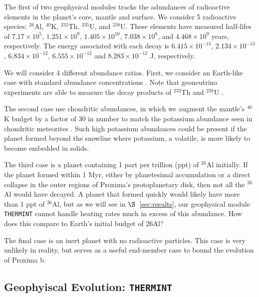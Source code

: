 \documentclass[preprint,12pt]{aastex}
\newcommand{\xxx}[1]{{\color{red} #1}} %
\def\eg{{\it e.g.\ }}
\def\thermint{\texttt{\footnotesize{THERMINT}}\xspace}
\begin{document}
The first of two geophysical modules tracks the adundances of
radioactive elements in the planet's core, mantle and surface. We
consider 5 radioactive species: $^{26}$Al, $^{40}$K, $^{232}$Th,
$^{235}$U, and $^{238}$U. These elements have measured half-lifes of
$7.17 \times 10^5$, $1.251 \times 10^9$, $1.405 \times 10^{10}$,
$7.038 \times 10^8$, and $4.468 \times 10^9$ years, respectively. The
energy associated with each decay is $6.415 \times 10^{-13}$,
$2.134 \times 10^{-13}$, $6.834 \times 10^{-12}$,
$6.555 \times 10^{-12}$ and $8.283 \times 10^{-12}$ J, respectively.

We will consider 4 different abundance ratios. First, we consider an
Earth-like case with standard abundance concentrations
\citep[\eg][]{Korenaga03,Arevalo09,Huang13}. Note that geoneutrino
experiments are able to measure the decay products of $^{232}$Th and
$^{238}$U \citep{Raghavan98,Araki05,Dye10}.

The second case use chondritic abundances, in which we augment the
mantle's $^{40}$K budget by a factor of 30 in number to match the
potassium abundance seen in chondritic meteorites
\citep{AndersGrevesse89,Arevalo09}. Such high potassium abundances could be
present if the planet formed beyond the snowline where potassium, a
volatile, is more likely to become embedded in solids.

The third case is a planet containing 1 part per trillion (ppt) of
$^{26}$Al initially. If the planet formed within 1 Myr, either by
planetesimal accumulation or a direct collapse in the outer regions of
Proxima's protoplanetary disk, then not all the $^{26}$Al would have
decayed. A planet that formed quickly would likely have more than 1
ppt of $^{26}$Al, but as we will see in $\S$~\ref{sec:results}, our
geophysical module \thermint cannot handle heating rates much in
excess of this abundance. \xxx{How does this compare to Earth's 
initial budget of 26Al?}

The final case is an inert planet with no radioactive particles. This
case is very unlikely in reality, but serves as a useful end-member
case to bound the evolution of Proxima b.

\subsection{Geophyiscal Evolution: \thermint}
\label{sec:models:thermint}
\end{document}
